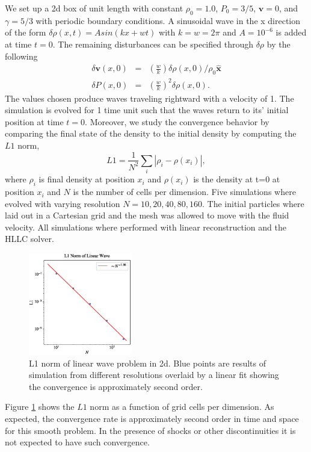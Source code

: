 We set up a 2d box of unit length with constant $\rho_0=1.0$, $P_0=3/5$, $\mathbf{v}=0$,
and $\gamma=5/3$ with periodic boundary conditions. A sinusoidal wave in the x direction of 
the form $\delta\rho(x,t) = Asin(kx + wt)$ with $k=w=2\pi$ and $A=10^{-6}$ is added at time 
$t=0$. The remaining disturbances can be specified through $\delta\rho$ by the following
\begin{equation}
	\begin{array}{rcl}
        \delta \mathbf{v}(x,0) & = & \left(\frac{w}{k}\right)\delta
        	\rho(x,0)/\rho_0\mathbf{\hat{x}}\\
        \delta P(x,0) & = & \left(\frac{w}{k}\right)^2\delta\rho(x,0).
    \end{array}
\end{equation}
The values chosen produce waves traveling rightward with a velocity of 1. The simulation is
evolved for 1 time unit such that the waves return to its' initial position at time $t=0$. 
Moreover, we study the convergence behavior by comparing the final state of the density to 
the initial density by computing the $L1$ norm,
\begin{equation}
	L1 = \frac{1}{N^2}\sum_i \left| \rho_i - \rho(x_i) \right|,
\end{equation}
where $\rho_i$ is final density at position $x_i$ and $\rho(x_i)$ is the density at t=0
at position $x_i$ and $N$ is the number of cells per dimension. Five simulations where evolved
with varying resolution $N=10, 20, 40, 80, 160$. The initial particles where laid out in a
Cartesian grid and the mesh was allowed to move with the fluid velocity. All simulations
where performed with linear reconstruction and the HLLC solver.
\begin{figure}
    \begin{center}
        \includegraphics[width=0.4\textwidth]{figures/linear-wave-l1.eps}
        \caption{L1 norm of linear wave problem in 2d. Blue points are results
        of simulation from different resolutions overlaid by a linear fit showing
        the convergence is approximately second order.}
        \label{fig.linear-wave}
    \end{center}
\end{figure}
Figure \ref{fig.linear-wave} shows the $L1$ norm as a function of grid cells per dimension.
As expected, the convergence rate is approximately second order in time and space for
this smooth problem. In the presence of shocks or other discontinuities it is not expected
to have such convergence.

